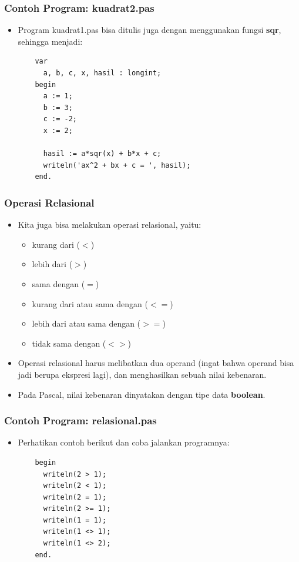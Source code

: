 \begin{frame}[fragile]
\frametitle{Contoh Program: kuadrat2.pas}
\begin{itemize}
  \item Program kuadrat1.pas bisa ditulis juga dengan menggunakan fungsi \textbf{sqr}, sehingga menjadi:
  \begin{lstlisting}
    var
      a, b, c, x, hasil : longint;
    begin
      a := 1;
      b := 3;
      c := -2;
      x := 2;

      hasil := a*sqr(x) + b*x + c;
      writeln('ax^2 + bx + c = ', hasil);
    end.
  \end{lstlisting}
\end{itemize}
\end{frame}

\begin{frame}
\frametitle{Operasi Relasional}
\begin{itemize}
  \item Kita juga bisa melakukan operasi relasional, yaitu:
  \begin{itemize}
    \item kurang dari ($<$)
    \item lebih dari ($>$)
    \item sama dengan ($=$)
    \item kurang dari atau sama dengan ($<=$)
    \item lebih dari atau sama dengan ($>=$)
    \item tidak sama dengan ($<>$)
  \end{itemize}
  \item Operasi relasional harus melibatkan dua operand (ingat bahwa operand bisa jadi berupa ekspresi lagi), dan menghasilkan sebuah nilai kebenaran.
  \item Pada Pascal, nilai kebenaran dinyatakan dengan tipe data \alert{\textbf{boolean}}.
\end{itemize}
\end{frame}

\begin{frame}[fragile]
\frametitle{Contoh Program: relasional.pas}
\begin{itemize}
  \item Perhatikan contoh berikut dan coba jalankan programnya:
  \begin{lstlisting}
    begin
      writeln(2 > 1);
      writeln(2 < 1);
      writeln(2 = 1);
      writeln(2 >= 1);
      writeln(1 = 1);
      writeln(1 <> 1);
      writeln(1 <> 2);
    end.
  \end{lstlisting}
\end{itemize}
\end{frame}


